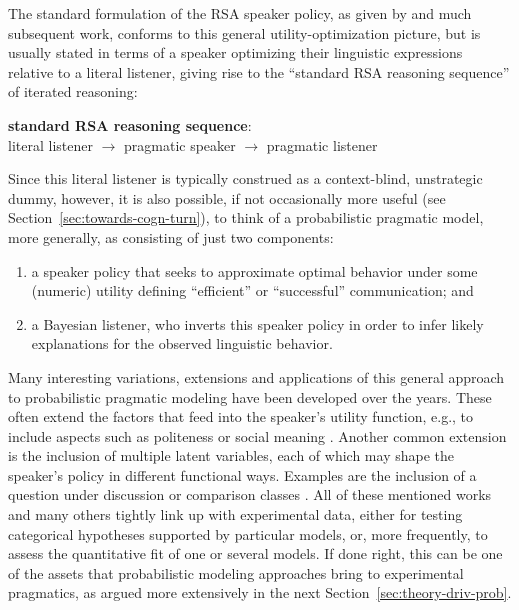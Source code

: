 \documentclass[fleqn,reqno,12pt]{article}
\begin{document}
The standard formulation of the RSA speaker policy, as given by \citet{FrankGoodman2012:Predicting-Prag} and much subsequent work, conforms to this general utility-optimization picture, but is usually stated in terms of a speaker optimizing their linguistic expressions relative to a literal listener, giving rise to the ``standard RSA reasoning sequence'' of iterated reasoning:
%
\begin{exe}
  \ex \label{bsp:RSA-sequence}
  \textbf{standard RSA reasoning sequence}: \\
  literal listener $\rightarrow$ pragmatic speaker \(\rightarrow\) pragmatic listener
\end{exe}
%
Since this literal listener is typically construed as a context-blind, unstrategic dummy, however, it is also possible, if not  occasionally more useful (see Section~\ref{sec:towards-cogn-turn}), to think of a probabilistic pragmatic model, more generally, as consisting of just two components:
\begin{enumerate}
  \item a speaker policy that seeks to approximate optimal behavior under some (numeric) utility defining ``efficient'' or ``successful'' communication; and
  \item a Bayesian listener, who inverts this speaker policy in order to infer likely explanations for the observed linguistic behavior.
\end{enumerate}

Many interesting variations, extensions and applications of this general approach to probabilistic pragmatic modeling have been developed over the years.
These often extend the factors that feed into the speaker's utility function, e.g., to include aspects such as politeness or social meaning \citep[e.g.][]{Burnett2019:Signalling-game,YoonTessler2020:Polite-Speech-E,CarcassiFranke2023:How-to-handle-t}.
Another common extension is the inclusion of multiple latent variables, each of which may shape the speaker's policy in different functional ways.
Examples are the inclusion of a question under discussion \citep[][]{KaoWu2014:Nonliteral-Unde} or comparison classes \citep{GrafDegen2016:Animal-dog-or-d,TesslerTsvilodub2020:Informational-g,TesslerGoodman2022:Warm-for-Winter}.
All of these mentioned works and many others tightly link up with experimental data, either for testing categorical hypotheses supported by particular models, or, more frequently, to assess the quantitative fit of one or several models.
If done right, this can be one of the assets that probabilistic modeling approaches bring to experimental pragmatics, as argued more extensively in the next Section~\ref{sec:theory-driv-prob}.
\end{document}
